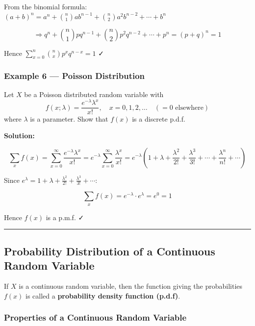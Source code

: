 \documentclass[
]{article}
\begin{document}
From the binomial formula:
\((a+b)^n = a^n + \binom{n}{1}ab^{n-1} + \binom{n}{2}a^2 b^{n-2} + \cdots + b^n\)

\[\Rightarrow q^n + \binom{n}{1}pq^{n-1} + \binom{n}{2}p^2 q^{n-2} + \cdots + p^n = (p+q)^n = 1\]

Hence \(\displaystyle\sum_{x=0}^{n} \binom{n}{x} p^x q^{n-x} = 1\) ✓

\subsubsection{Example 6 --- Poisson
Distribution}\label{example-6-poisson-distribution}

Let \(X\) be a Poisson distributed random variable with
\[f(x;\lambda) = \frac{e^{-\lambda}\lambda^x}{x!},\quad x = 0, 1, 2, \ldots \quad (= 0 \text{ elsewhere})\]
where \(\lambda\) is a parameter. Show that \(f(x)\) is a discrete
p.d.f.

\textbf{Solution:}

\[\sum_{x} f(x) = \sum_{x=0}^{\infty} \frac{e^{-\lambda}\lambda^x}{x!} = e^{-\lambda}\sum_{x=0}^{\infty} \frac{\lambda^x}{x!} = e^{-\lambda}\left(1 + \lambda + \frac{\lambda^2}{2!} + \frac{\lambda^3}{3!} + \cdots + \frac{\lambda^n}{n!} + \cdots\right)\]

Since
\(e^{\lambda} = 1 + \lambda + \frac{\lambda^2}{2!} + \frac{\lambda^3}{3!} + \cdots\):

\[\sum_{x} f(x) = e^{-\lambda} \cdot e^{\lambda} = e^0 = 1\]

Hence \(f(x)\) is a p.m.f. ✓

\begin{center}\rule{0.5\linewidth}{0.5pt}\end{center}

\subsection{Probability Distribution of a Continuous Random
Variable}\label{probability-distribution-of-a-continuous-random-variable}

If \(X\) is a continuous random variable, then the function giving the
probabilities \(f(x)\) is called a \textbf{probability density function
(p.d.f)}.

\subsubsection{Properties of a Continuous Random
Variable}\label{properties-of-a-continuous-random-variable}
\end{document}
